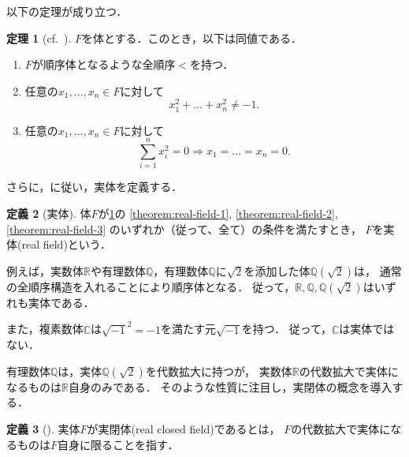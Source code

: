 \documentclass[uplatex, dvipdfmx]{jsarticle}
\numberwithin{equation}{section}
\newcommand{\R}{\mathbb{R}}
\newcommand{\Q}{\mathbb{Q}}
\newcommand{\C}{\mathbb{C}}
\theoremstyle{definition}
\newtheorem{definition}{定義}[section]
\newtheorem{theorem}[definition]{定理}
\begin{document}
以下の定理が成り立つ．

\begin{theorem}[{cf.~\cite[Theorem 1.1.8]{MR1659509}}]\label{theorem:real-field}
     $F$を体とする．このとき，以下は同値である．
     \begin{enumerate}
          \item \label{theorem:real-field-1}
          $F$が順序体となるような全順序$<$を持つ．
          \item \label{theorem:real-field-2}
          任意の$x_1, \dots, x_n \in F$に対して
          \begin{equation}
               x_1^2 + \dots + x_n^2 \neq -1.
          \end{equation}
          \item \label{theorem:real-field-3}
          任意の$x_1, \dots, x_n \in F$に対して
          \begin{equation}
               \sum_{i=1}^n x_i^2 = 0 \Rightarrow x_1 = \dots = x_n = 0.
          \end{equation}
     \end{enumerate}
\end{theorem}

さらに，\cite[Definition 1.1.9]{MR1659509}に従い，実体を定義する．

\begin{definition}[実体]
     体$F$が\cref{theorem:real-field}の
     \ref{theorem:real-field-1},
     \ref{theorem:real-field-2},
     \ref{theorem:real-field-3}
     のいずれか（従って、全て）の条件を満たすとき，
     $F$を実体(real field)という．
\end{definition}


例えば，実数体$\R$や有理数体$\Q$，有理数体$\Q$に$\sqrt{2}$を添加した体$\Q\left(\sqrt{2}\right)$は，
通常の全順序構造を入れることにより順序体となる．
従って，$\R, \Q, \Q\left(\sqrt{2}\right)$はいずれも実体である．

また，複素数体$\C$は$\sqrt{-1}^2 = -1$を満たす元$\sqrt{-1}$を持つ．
従って，$\C$は実体ではない．

有理数体$\Q$は，実体$\Q\left(\sqrt{2}\right)$を代数拡大に持つが，
実数体$\R$の代数拡大で実体になるものは$\R$自身のみである．
そのような性質に注目し，実閉体の概念を導入する．

\begin{definition}[{\cite[Section I]{MR3069467}}] \label{definition:RCF}
     実体$F$が実閉体(real closed field)であるとは，
     $F$の代数拡大で実体になるものは$F$自身に限ることを指す．
\end{definition}
\end{document}
